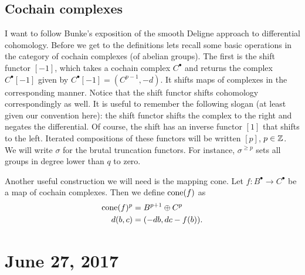 \documentclass{amsart}
\begin{document}
\subsection{Cochain complexes}

I want to follow Bunke's exposition of the smooth Deligne approach to differential
cohomology. Before we get to the definitions lets recall some basic operations in
the category of cochain complexes (of abelian groups). The first is the shift functor $[-1]$, which 
takes a cochain complex $C^\bullet$ and returns the complex $C^\bullet[-1]$ given
by $C^\bullet[-1] = (C^{p-1}, -d)$. It shifts maps of complexes in the corresponding
manner.  Notice that the shift functor shifts cohomology correspondingly as well.
It is useful to remember the following slogan
(at least given our convention here):
the shift functor shifts the complex to the right and negates the differential.
Of course, the shift has an inverse functor $[1]$ that shifts to the left. Iterated
compositions of these functors will be written $[p]$, $p\in\mathbb{Z}$.
We will write $\sigma$ for the brutal truncation functors. For instance, $\sigma^{\geq p}$
sets all groups in degree lower than $q$ to zero.

Another useful construction we will need is the mapping cone. Let $f:B^\bullet\to C^\bullet$
be a map of cochain complexes. Then we define $\operatorname{cone}(f)$ as
\begin{align*}
    \operatorname{cone}(f)^p &= B^{p+1}\oplus C^p\\
    d(b,c) &= (-db, dc -f(b)).
\end{align*}

\section{June 27, 2017}
\end{document}
